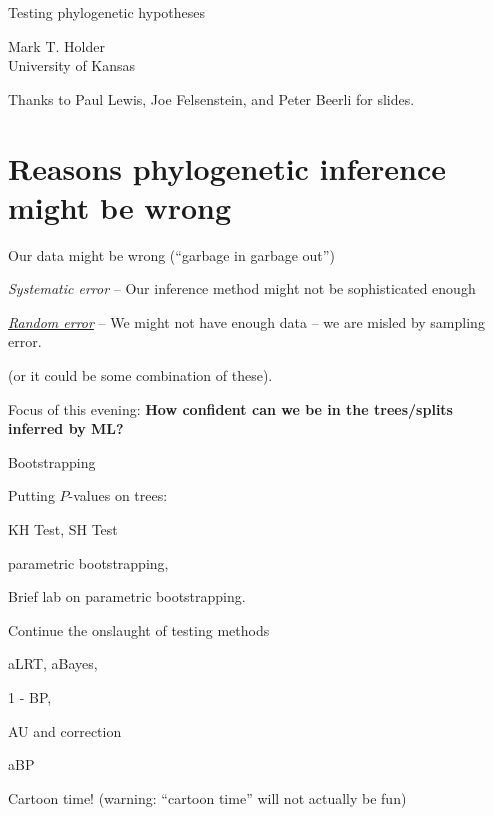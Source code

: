 \documentclass[landscape]{foils}
\begin{document}
\myNewSlide
\huge 
{\begin{center}Testing phylogenetic hypotheses\end{center}}
\vskip 3cm
\normalsize
Mark T. Holder\\
University of Kansas\par 
Thanks to Paul Lewis, Joe Felsenstein, and Peter Beerli for slides.

\myNewSlide
\section*{Reasons phylogenetic inference might be wrong}
\Large
\begin{compactenum}
	\item Our data might be wrong (``garbage in garbage out'')
	\item {\em Systematic error} -- Our inference method might not be sophisticated enough
	\item \underline{{\em Random error}} -- We might not have enough data --  we are misled by sampling error.
\end{compactenum}

(or it could be some combination of these).

{Focus of this evening: {\bf How confident can we be in the trees/splits inferred by ML?}}

\myNewSlide
\begin{compactenum}
	\item Bootstrapping
	\item Putting $P$-values on trees:
	\begin{compactitem}
		\item KH Test, SH Test
		\item parametric bootstrapping,
	\end{compactitem}
	\item Brief lab on parametric bootstrapping.
	\item Continue the onslaught of testing methods
	\begin{compactitem}
		\item aLRT, aBayes,
		\item 1 - BP,
		\item AU and \citet{EfronHH1996} correction
		\item aBP
	\end{compactitem}
	\item Cartoon time! ({\small warning: ``cartoon time'' will not actually be fun})
\end{compactenum}
\end{document}
